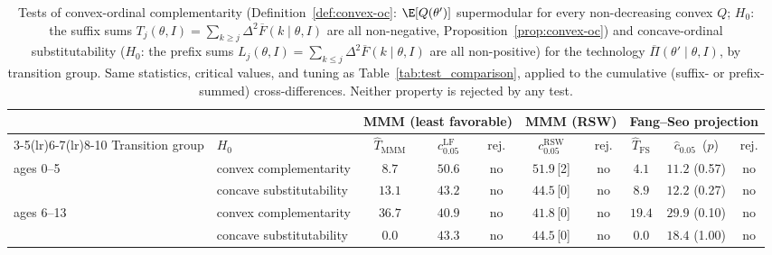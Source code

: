 \begin{table}[htbp]
\centering\small
\begin{tabular}{@{}llcccccccc@{}}
\toprule
 & & \multicolumn{3}{c}{MMM (least favorable)} & \multicolumn{2}{c}{MMM (RSW)} & \multicolumn{3}{c}{Fang--Seo projection} \\
\cmidrule(lr){3-5}\cmidrule(lr){6-7}\cmidrule(lr){8-10}
Transition group & $H_0$ & $\hat T_{\mathrm{MMM}}$ & $c^{\mathrm{LF}}_{0.05}$ & rej. & $c^{\mathrm{RSW}}_{0.05}$ & rej. & $\hat T_{\mathrm{FS}}$ & $\hat c_{0.05}$ \,($p$) & rej. \\ \midrule
ages 0--5 & convex complementarity & $8.7$ & $50.6$ & no & $51.9$\,[2] & no & $4.1$ & $11.2$ (0.57) & no \\
 & concave substitutability & $13.1$ & $43.2$ & no & $44.5$\,[0] & no & $8.9$ & $12.2$ (0.27) & no \\
\midrule
ages 6--13 & convex complementarity & $36.7$ & $40.9$ & no & $41.8$\,[0] & no & $19.4$ & $29.9$ (0.10) & no \\
 & concave substitutability & $0.0$ & $43.3$ & no & $44.5$\,[0] & no & $0.0$ & $18.4$ (1.00) & no \\
\bottomrule
\end{tabular}
\caption{Tests of convex-ordinal complementarity (Definition~\ref{def:convex-oc}: $\E[Q(\theta')]$
supermodular for every non-decreasing convex $Q$; $H_0$: the suffix sums
$T_j(\theta,I)=\sum_{k\geq j}\Delta^2\overline F(k\mid\theta,I)$ are all non-negative,
Proposition~\ref{prop:convex-oc}) and concave-ordinal substitutability ($H_0$: the prefix
sums $L_j(\theta,I)=\sum_{k\leq j}\Delta^2\overline F(k\mid\theta,I)$ are all
non-positive) for the technology $\overline\Pi(\theta'\mid\theta,I)$, by transition
group. Same statistics, critical values, and tuning as Table~\ref{tab:test_comparison},
applied to the cumulative (suffix- or prefix-summed) cross-differences. Neither property is
rejected by any test.}
\label{tab:shape}
\end{table}
